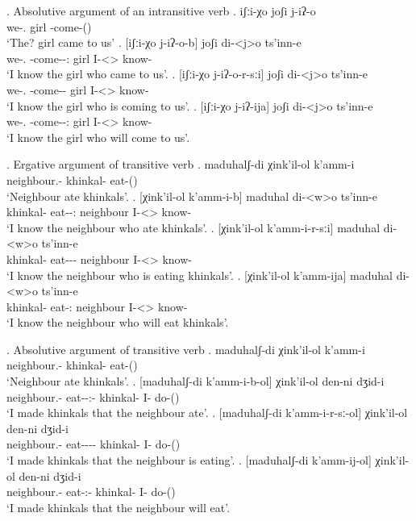 \ex. Absolutive argument of an intransitive verb
	\ag. iʃːi-χo joʃi j-iʔ-o\\
		 {we-\Add.\Lat} {girl} {\F-come-\Pst(\Aor)}\\
		 \glt    `The? girl came to us'
	\bg. [iʃːi-χo j-iʔ-o-b] joʃi di-<j>o ts'inn-e \\
		  {we-\Add.\Lat} {\F-come-\Pst-\Ptcp:\Pst} {girl} {I-<\F>\Aff} {know-\Hab}\\
		 \glt    `I know the girl who came to us'.
	\bg. [iʃːi-χo j-iʔ-o-r-sːi] joʃi di-<j>o ts'inn-e \\
		  {we-\Add.\Lat} {\F-come-\Prog-\Attr} {girl} {I-<\F>\Aff} {know-\Hab}\\
		 \glt    `I know the girl who is coming to us'.
	\bg. [iʃːi-χo j-iʔ-ija] joʃi di-<j>o ts'inn-e \\
		  {we-\Add.\Lat} {\F-come-\Pst-\Ptcp:\Fut} {girl} {I-<\F>\Aff} {know-\Hab}\\
		 \glt    `I know the girl who will come to us'. 

\ex. Ergative argument of transitive verb
	\ag. maduhalʃ-di χink'il-ol k'amm-i\\
			{neighbour.\Obl-\Erg} {khinkal-\Pl} {eat-\Pst(\Aor)}\\
			\glt `Neighbour ate khinkals'.
	\bg. [χink'il-ol k'amm-i-b] maduhal di-<w>o ts'inn-e \\
			{khinkal-\Pl} {eat-\Pst-\Ptcp:\Pst} neighbour {I-<\M>\Aff} {know-\Hab} \\
		 \glt    `I know the neighbour who ate khinkals'.
	\bg. [χink'il-ol k'amm-i-r-sːi] maduhal di-<w>o ts'inn-e \\
			{khinkal-\Pl} {eat-\Pst-\Prog-\Attr} neighbour {I-<\M>\Aff} {know-\Hab} \\
		 \glt    `I know the neighbour who is eating khinkals'.
	\bg. [χink'il-ol k'amm-ija] maduhal di-<w>o ts'inn-e \\
			{khinkal-\Pl} {eat-\Ptcp:\Fut} neighbour {I-<\M>\Aff} {know-\Hab} \\
		 \glt    `I know the neighbour who will eat khinkals'.

\ex. Absolutive argument of transitive verb
	\ag. maduhalʃ-di χink'il-ol k'amm-i\\
			{neighbour.\Obl-\Erg} {khinkal-\Pl} {eat-\Pst(\Aor)}\\
			\glt `Neighbour ate khinkals'.
	\bg. [maduhalʃ-di k'amm-i-b-ol] χink'il-ol den-ni dʒid-i\\
			{neighbour.\Obl-\Erg} {eat-\Pst-\Ptcp:\Pst-\Pl} {khinkal-\Pl}  {I-\Erg} {do-\Pst(\Aor)}\\
		 \glt    `I made khinkals that the neighbour ate'.
	\bg. [maduhalʃ-di k'amm-i-r-sː-ol] χink'il-ol den-ni dʒid-i\\
			{neighbour.\Obl-\Erg} {eat-\Pst-\Prog-\Attr-\Pl} {khinkal-\Pl} {I-\Erg} {do-\Pst(\Aor)}\\
		 \glt    `I made khinkals that the neighbour is eating'.
	\bg. [maduhalʃ-di k'amm-ij-ol] χink'il-ol den-ni dʒid-i\\
			{neighbour.\Obl-\Erg} {eat-\Ptcp:\Fut-\Pl} {khinkal-\Pl}  {I-\Erg} {do-\Pst(\Aor)}\\
		 \glt    `I made khinkals that the neighbour will eat'.		

